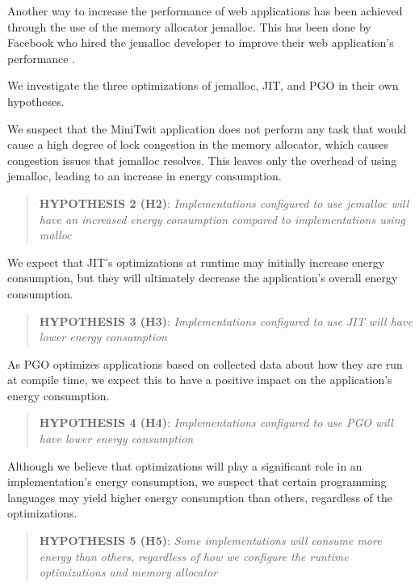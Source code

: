 \documentclass[../main.tex]{subfiles}
\begin{document}
Another way to increase the performance of web applications has been achieved through the use of the memory allocator jemalloc. This has been done by Facebook who hired the jemalloc developer to improve their web application's performance \cite{facebook-jemalloc}. 

We investigate the three optimizations of jemalloc, JIT, and PGO in their own hypotheses.

We suspect that the MiniTwit application does not perform any task that would cause a high degree of lock congestion in the memory allocator, which causes congestion issues that jemalloc resolves. This leaves only the overhead of using jemalloc, leading to an increase in energy consumption.

\begin{quote}
    \textbf{HYPOTHESIS 2 (H2)}: \emph{Implementations configured to use jemalloc will have an increased energy consumption compared to implementations using malloc}
\end{quote}

We expect that JIT's optimizations at runtime may initially increase energy consumption, but they will ultimately decrease the application's overall energy consumption.  

\begin{quote}
    \textbf{HYPOTHESIS 3 (H3)}: \emph{Implementations configured to use JIT will have lower energy consumption}
\end{quote}

As PGO optimizes applications based on collected data about how they are run at compile time, we expect this to have a positive impact on the application's energy consumption. 

\begin{quote}
    \textbf{HYPOTHESIS 4 (H4)}: \emph{Implementations configured to use PGO will have lower energy consumption}
\end{quote}

Although we believe that optimizations will play a significant role in an implementation's energy consumption, we suspect that certain programming languages may yield higher energy consumption than others, regardless of the optimizations. 

\begin{quote}
    \textbf{HYPOTHESIS 5 (H5)}: \emph{Some implementations will consume more energy than others, regardless of how we configure the runtime optimizations and memory allocator}
\end{quote}
\end{document}
